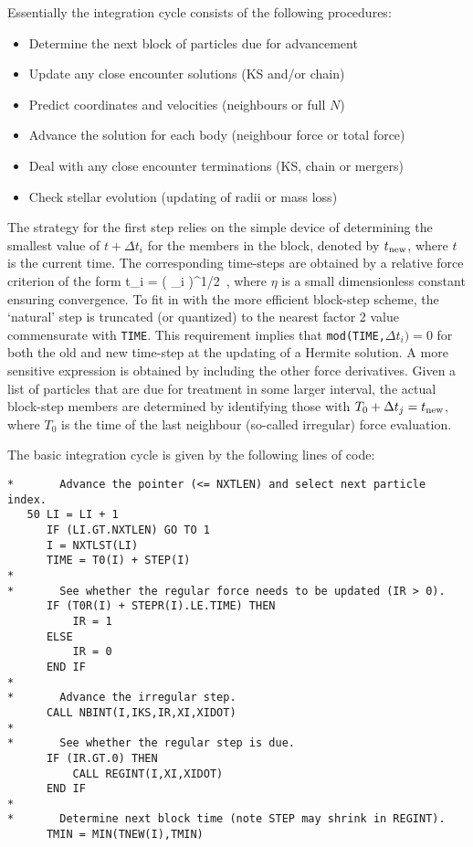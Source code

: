 \documentclass[12pt]{article}
\begin{document}
Essentially the integration cycle consists of the following procedures:

\begin{itemize}
\item Determine the next block of particles due for advancement
\item Update any close encounter solutions (KS and/or chain)
\item Predict coordinates and velocities (neighbours or full $N$)
\item Advance the solution for each body (neighbour force or total force)
\item Deal with any close encounter terminations (KS, chain or mergers)
\item Check stellar evolution (updating of radii or mass loss)
\end{itemize}

The strategy for the first step relies on the simple device of determining
the smallest value of $t + \Delta t_i$ for the members in the block, denoted
by $t_{\rm new}$, where $t$ is the current time.
The corresponding time-steps are obtained by a relative force criterion of
the form
\be
\Delta t_i = 
\left( 
 {{}_i \vert} \right)^{1/2} \,,
\ee
where $\eta$ is a small dimensionless constant ensuring convergence.
To fit in with the more efficient block-step scheme, the `natural' step
is truncated (or quantized) to the nearest factor 2 value commensurate with
{\tt TIME}.
This requirement implies that {\tt mod(TIME,$\Delta t_i)=0$} for
both the old and new time-step at the updating of a Hermite solution.
A more sensitive expression is obtained by including the other force
derivatives.
Given a list of particles that are due for treatment in some larger
interval, the actual block-step members are determined by identifying
those with $T_0 + \Delta t_j = t_{\rm new}$, where $T_0$ is the time
of the last neighbour (so-called irregular) force evaluation.

The basic integration cycle is given by the following lines of code:

\begin{verbatim}
*       Advance the pointer (<= NXTLEN) and select next particle index.
   50 LI = LI + 1
      IF (LI.GT.NXTLEN) GO TO 1
      I = NXTLST(LI)
      TIME = T0(I) + STEP(I)
*
*       See whether the regular force needs to be updated (IR > 0).
      IF (T0R(I) + STEPR(I).LE.TIME) THEN
          IR = 1
      ELSE
          IR = 0
      END IF
*
*       Advance the irregular step.
      CALL NBINT(I,IKS,IR,XI,XIDOT)
*
*       See whether the regular step is due.
      IF (IR.GT.0) THEN
          CALL REGINT(I,XI,XIDOT)
      END IF
*
*       Determine next block time (note STEP may shrink in REGINT).
      TMIN = MIN(TNEW(I),TMIN)
\end{verbatim}
\end{document}
